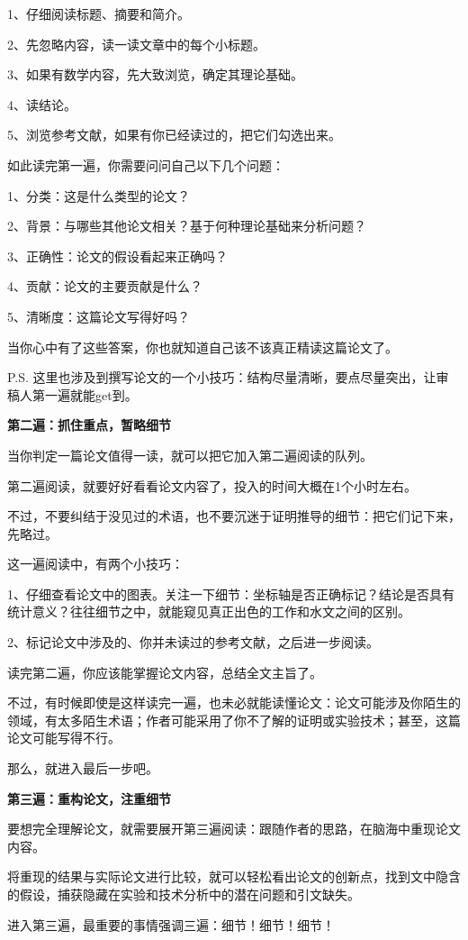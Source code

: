 \documentclass[]{ctexbook}
\begin{document}
1、仔细阅读标题、摘要和简介。

2、先忽略内容，读一读文章中的每个小标题。

3、如果有数学内容，先大致浏览，确定其理论基础。

4、读结论。

5、浏览参考文献，如果有你已经读过的，把它们勾选出来。

如此读完第一遍，你需要问问自己以下几个问题：

1、分类：这是什么类型的论文？

2、背景：与哪些其他论文相关？基于何种理论基础来分析问题？

3、正确性：论文的假设看起来正确吗？

4、贡献：论文的主要贡献是什么？

5、清晰度：这篇论文写得好吗？

当你心中有了这些答案，你也就知道自己该不该真正精读这篇论文了。

P.S. 这里也涉及到撰写论文的一个小技巧：结构尽量清晰，要点尽量突出，让审稿人第一遍就能get到。

\textbf{第二遍：抓住重点，暂略细节}

当你判定一篇论文值得一读，就可以把它加入第二遍阅读的队列。

第二遍阅读，就要好好看看论文内容了，投入的时间大概在1个小时左右。

不过，不要纠结于没见过的术语，也不要沉迷于证明推导的细节：把它们记下来，先略过。

这一遍阅读中，有两个小技巧：

1、仔细查看论文中的图表。关注一下细节：坐标轴是否正确标记？结论是否具有统计意义？往往细节之中，就能窥见真正出色的工作和水文之间的区别。

2、标记论文中涉及的、你并未读过的参考文献，之后进一步阅读。

读完第二遍，你应该能掌握论文内容，总结全文主旨了。

不过，有时候即使是这样读完一遍，也未必就能读懂论文：论文可能涉及你陌生的领域，有太多陌生术语；作者可能采用了你不了解的证明或实验技术；甚至，这篇论文可能写得不行。

那么，就进入最后一步吧。

\textbf{第三遍：重构论文，注重细节}

要想完全理解论文，就需要展开第三遍阅读：跟随作者的思路，在脑海中重现论文内容。

将重现的结果与实际论文进行比较，就可以轻松看出论文的创新点，找到文中隐含的假设，捕获隐藏在实验和技术分析中的潜在问题和引文缺失。

进入第三遍，最重要的事情强调三遍：细节！细节！细节！
\end{document}
